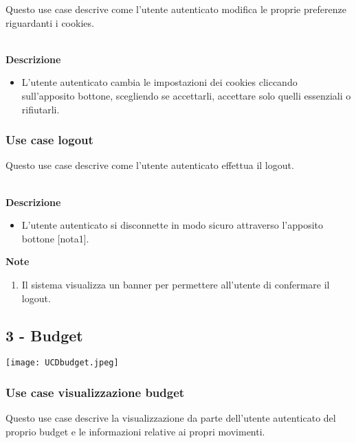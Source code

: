 \documentclass[a4paper,12pt]{article}
\begin{document}
Questo use case descrive come l'utente autenticato modifica le proprie preferenze riguardanti i cookies.

\textbf{\\Descrizione}
\begin{itemize} \setlength\itemsep{0.01em}
\item L'utente autenticato cambia le impostazioni dei cookies cliccando sull'apposito bottone, scegliendo se accettarli, accettare solo quelli essenziali o rifiutarli.
\end{itemize}

\subsubsection*{Use case logout}

Questo use case descrive come l'utente autenticato effettua il logout.

\textbf{\\Descrizione}
\begin{itemize} \setlength\itemsep{0.01em}
\item L'utente autenticato si disconnette in modo sicuro attraverso l'apposito bottone [nota1].
\end{itemize}

\textbf{Note}
\begin{enumerate} \setlength\itemsep{0.01em}
\item Il sistema visualizza un banner per permettere all'utente di confermare il logout.
\end{enumerate}


\subsection*{3 - Budget}

\begin{center}
  \texttt{[image: UCDbudget.jpeg]}
\end{center}

\subsubsection*{Use case visualizzazione budget}

Questo use case descrive la visualizzazione da parte dell'utente autenticato del proprio budget e le informazioni relative ai propri movimenti.
\end{document}

